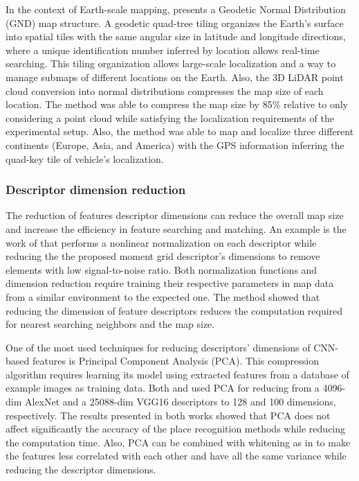 In the context of Earth-scale mapping, \cite{kim-et-al:2021:3047421} presents a Geodetic Normal Distribution (GND) map structure. A geodetic quad-tree tiling organizes the Earth's surface into spatial tiles with the same angular size in latitude and longitude directions, where a unique identification number inferred by location allows real-time searching. This tiling organization allows large-scale localization and a way to manage submaps of different locations on the Earth. Also, the 3D LiDAR point cloud conversion into normal distributions compresses the map size of each location.
The method was able to compress the map size by 85\% relative to only considering a point cloud while satisfying the localization requirements of the experimental setup. Also, the method was able to map and localize three different continents (Europe, Asia, and America) with the GPS information inferring the quad-key tile of vehicle's localization.



\subsubsection{Descriptor dimension reduction}

The reduction of features descriptor dimensions can reduce the overall map size and increase the efficiency in feature searching and matching.
An example is the work of \cite{bosse-zlot:2009:009} that performs a nonlinear normalization on each descriptor while reducing the the proposed moment grid descriptor's dimensions to remove elements with low signal-to-noise ratio. Both normalization functions and dimension reduction require training their respective parameters in map data from a similar environment to the expected one. The method showed that reducing the dimension of feature descriptors reduces the computation required for nearest searching neighbors and the map size.

One of the most used techniques for reducing descriptors' dimensions of CNN-based features is Principal Component Analysis (PCA). This compression algorithm requires learning its model using extracted features from a database of example images as training data. Both \cite{taisho-kanji:2016:7866383} and \cite{camara-et-al:2020:9196967} used PCA for reducing from a 4096-dim AlexNet and a 25088-dim VGG16 descriptors to 128 and 100 dimensions, respectively. The results presented in both works showed that PCA does not affect significantly the accuracy of the place recognition methods while reducing the computation time.
Also, PCA can be combined with whitening as in \cite{piasco-et-al:2021:6} to make the features less correlated with each other and have all the same variance while reducing the descriptor dimensions.

